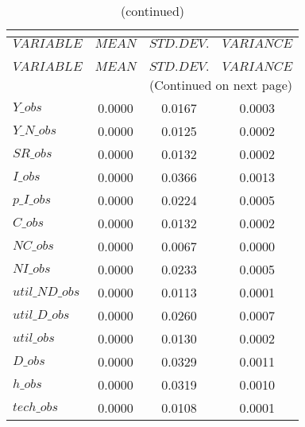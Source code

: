  
\begin{center}
\begin{longtable}{lccc} 
\caption{THEORETICAL MOMENTS}\\
 \label{Table:th_moments}\\
\toprule 
$VARIABLE       $	 & 	 $         MEAN$	 & 	 $    STD. DEV.$	 & 	 $     VARIANCE$\\
\midrule \endfirsthead 
\caption{(continued)}\\
 \toprule \\ 
$VARIABLE       $	 & 	 $         MEAN$	 & 	 $    STD. DEV.$	 & 	 $     VARIANCE$\\
\midrule \endhead 
\midrule \multicolumn{4}{r}{(Continued on next page)} \\ \bottomrule \endfoot 
\bottomrule \endlastfoot 
$Y\_obs         $	 & 	       0.0000	 & 	       0.0167	 & 	       0.0003 \\ 
$Y\_N\_obs      $	 & 	       0.0000	 & 	       0.0125	 & 	       0.0002 \\ 
$SR\_obs        $	 & 	       0.0000	 & 	       0.0132	 & 	       0.0002 \\ 
$I\_obs         $	 & 	       0.0000	 & 	       0.0366	 & 	       0.0013 \\ 
$p\_I\_obs      $	 & 	       0.0000	 & 	       0.0224	 & 	       0.0005 \\ 
$C\_obs         $	 & 	       0.0000	 & 	       0.0132	 & 	       0.0002 \\ 
$NC\_obs        $	 & 	       0.0000	 & 	       0.0067	 & 	       0.0000 \\ 
$NI\_obs        $	 & 	       0.0000	 & 	       0.0233	 & 	       0.0005 \\ 
$util\_ND\_obs  $	 & 	       0.0000	 & 	       0.0113	 & 	       0.0001 \\ 
$util\_D\_obs   $	 & 	       0.0000	 & 	       0.0260	 & 	       0.0007 \\ 
$util\_obs      $	 & 	       0.0000	 & 	       0.0130	 & 	       0.0002 \\ 
$D\_obs         $	 & 	       0.0000	 & 	       0.0329	 & 	       0.0011 \\ 
$h\_obs         $	 & 	       0.0000	 & 	       0.0319	 & 	       0.0010 \\ 
$tech\_obs      $	 & 	       0.0000	 & 	       0.0108	 & 	       0.0001 \\ 
\end{longtable}
 \end{center}
